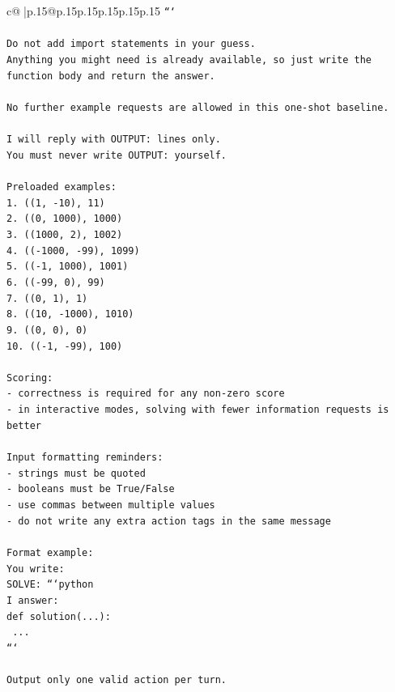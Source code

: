 \documentclass{article}
\begin{document}
{\begin{supertabular}{c@{$\;$}|p{.15\linewidth}@{}p{.15\linewidth}p{.15\linewidth}p{.15\linewidth}p{.15\linewidth}p{.15\linewidth}}
{{{\texttt{```} \\
\\ 
\texttt{Do not add import statements in your guess.} \\
\texttt{Anything you might need is already available, so just write the function body and return the answer.} \\
\\ 
\texttt{No further example requests are allowed in this one{-}shot baseline.} \\
\\ 
\texttt{I will reply with OUTPUT: lines only.} \\
\texttt{You must never write OUTPUT: yourself.} \\
\\ 
\texttt{Preloaded examples:} \\
\texttt{1. ((1, {-}10), 11)} \\
\texttt{2. ((0, 1000), 1000)} \\
\texttt{3. ((1000, 2), 1002)} \\
\texttt{4. (({-}1000, {-}99), 1099)} \\
\texttt{5. (({-}1, 1000), 1001)} \\
\texttt{6. (({-}99, 0), 99)} \\
\texttt{7. ((0, 1), 1)} \\
\texttt{8. ((10, {-}1000), 1010)} \\
\texttt{9. ((0, 0), 0)} \\
\texttt{10. (({-}1, {-}99), 100)} \\
\\ 
\texttt{Scoring:} \\
\texttt{{-} correctness is required for any non{-}zero score} \\
\texttt{{-} in interactive modes, solving with fewer information requests is better} \\
\\ 
\texttt{Input formatting reminders:} \\
\texttt{{-} strings must be quoted} \\
\texttt{{-} booleans must be True/False} \\
\texttt{{-} use commas between multiple values} \\
\texttt{{-} do not write any extra action tags in the same message} \\
\\ 
\texttt{Format example:} \\
\texttt{You write:} \\
\texttt{SOLVE: ```python} \\
\texttt{I answer:} \\
\texttt{def solution(...):} \\
\texttt{    ...} \\
\texttt{```} \\
\\ 
\texttt{Output only one valid action per turn.} \\
            }
        }
    }
     \\ \\


\end{supertabular}}
\end{document}
